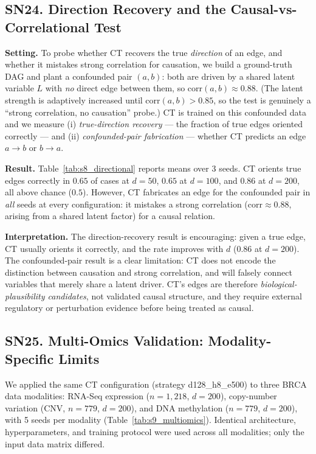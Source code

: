 \documentclass[12pt,a4paper]{article}
\begin{document}
\subsection*{SN24. Direction Recovery and the Causal-vs-Correlational Test}

\textbf{Setting.} To probe whether CT recovers the true \emph{direction} of an edge, and whether it mistakes strong correlation for causation, we build a ground-truth DAG and plant a confounded pair $(a,b)$: both are driven by a shared latent variable $L$ with \emph{no} direct edge between them, so $\mathrm{corr}(a,b) \approx 0.88$. (The latent strength is adaptively increased until $\mathrm{corr}(a,b) > 0.85$, so the test is genuinely a ``strong correlation, no causation'' probe.) CT is trained on this confounded data and we measure (i) \emph{true-direction recovery} --- the fraction of true edges oriented correctly --- and (ii) \emph{confounded-pair fabrication} --- whether CT predicts an edge $a \to b$ or $b \to a$.

\textbf{Result.} Table~\ref{tab:s8_directional} reports means over 3 seeds. CT orients true edges correctly in $0.65$ of cases at $d=50$, $0.65$ at $d=100$, and $0.86$ at $d=200$, all above chance ($0.5$). However, CT fabricates an edge for the confounded pair in \emph{all} seeds at every configuration: it mistakes a strong correlation ($\mathrm{corr} \approx 0.88$, arising from a shared latent factor) for a causal relation.

\textbf{Interpretation.} The direction-recovery result is encouraging: given a true edge, CT usually orients it correctly, and the rate improves with $d$ ($0.86$ at $d=200$). The confounded-pair result is a clear limitation: CT does not encode the distinction between causation and strong correlation, and will falsely connect variables that merely share a latent driver. CT's edges are therefore \emph{biological-plausibility candidates}, not validated causal structure, and they require external regulatory or perturbation evidence before being treated as causal.

\subsection*{SN25. Multi-Omics Validation: Modality-Specific Limits}

We applied the same CT configuration (strategy d128\_h8\_e500) to three BRCA data modalities: RNA-Seq expression ($n=1{,}218$, $d=200$), copy-number variation (CNV, $n=779$, $d=200$), and DNA methylation ($n=779$, $d=200$), with 5 seeds per modality (Table~\ref{tab:s9_multiomics}). Identical architecture, hyperparameters, and training protocol were used across all modalities; only the input data matrix differed.
\end{document}
